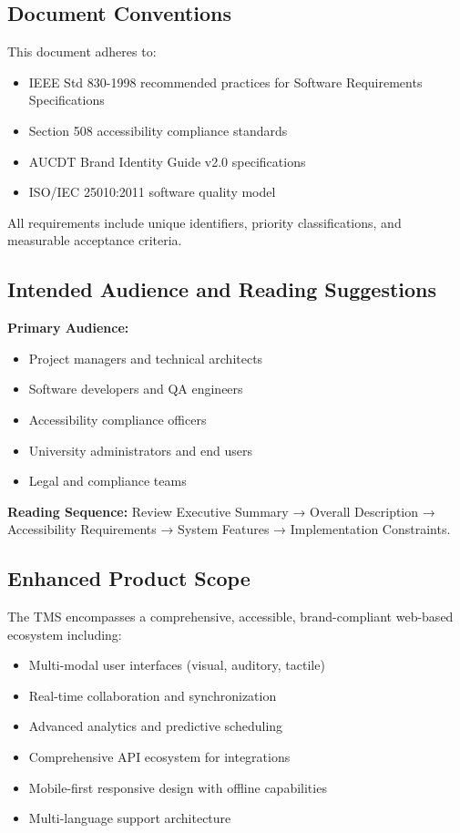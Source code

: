 \documentclass[11pt, a4paper]{article}
\begin{document}
\subsection{Document Conventions}
\label{sec:conventions}
This document adheres to:
\begin{itemize}
    \item IEEE Std 830-1998 recommended practices for Software Requirements Specifications
    \item Section 508 accessibility compliance standards
    \item AUCDT Brand Identity Guide v2.0 specifications
    \item ISO/IEC 25010:2011 software quality model
\end{itemize}

All requirements include unique identifiers, priority classifications, and measurable acceptance criteria.

\subsection{Intended Audience and Reading Suggestions}
\label{sec:audience}
\textbf{Primary Audience:}
\begin{itemize}
    \item Project managers and technical architects
    \item Software developers and QA engineers
    \item Accessibility compliance officers
    \item University administrators and end users
    \item Legal and compliance teams
\end{itemize}

\textbf{Reading Sequence:} Review Executive Summary → Overall Description → Accessibility Requirements → System Features → Implementation Constraints.

\subsection{Enhanced Product Scope}
\label{sec:scope}
The TMS encompasses a comprehensive, accessible, brand-compliant web-based ecosystem including:

\begin{itemize}
    \item Multi-modal user interfaces (visual, auditory, tactile)
    \item Real-time collaboration and synchronization
    \item Advanced analytics and predictive scheduling
    \item Comprehensive API ecosystem for integrations
    \item Mobile-first responsive design with offline capabilities
    \item Multi-language support architecture
\end{itemize}
\end{document}

